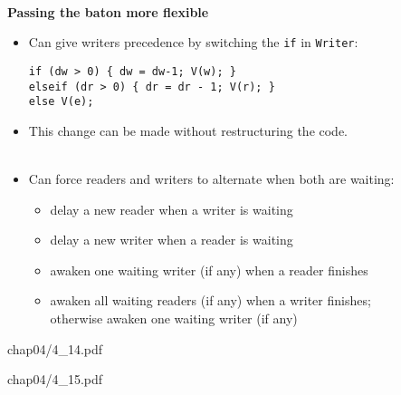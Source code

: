 \documentclass{article}
\newcommand{\myfig}[1]{\begin{overpic}[scale=1.5]{#1}}
\newcommand{\myfigtiny}[1]{\begin{overpic}[scale=1.0]{#1}}
\newcommand{\myfigend}{\end{overpic}\newpage}
\newcommand{\bi}{\begin{itemize}}
\newcommand{\ii}{\item}
\newcommand{\ei}{\end{itemize}}
\newcommand{\ti}[1]{
\mbox{~}

\vspace{1.25in}
\centerline{\bf #1}}
\begin{document}
\ti{Passing the baton more flexible}
\bi
\ii Can give writers precedence by switching the {\tt if} in {\tt Writer}:
\begin{Verbatim}
if (dw > 0) { dw = dw-1; V(w); }
elseif (dr > 0) { dr = dr - 1; V(r); }
else V(e);
\end{Verbatim}
\ii This change can be made without restructuring the code.
\\\\
\ii Can force readers and writers to alternate when both are waiting:
\bi
\ii delay a new reader when a writer is waiting
\ii delay a new writer when a reader is waiting
\ii awaken one waiting writer (if any) when a reader finishes
\ii awaken all waiting readers (if any) when a writer finishes;\\
 otherwise awaken one waiting writer (if any)
\ei
\ei
\newpage

\myfig{chap04/4_14.pdf}
\myfigend

\myfigtiny{chap04/4_15.pdf}
\myfigend
\end{document}
